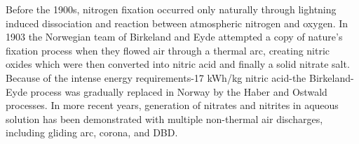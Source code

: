 Before the 1900s, nitrogen fixation occurred only naturally through lightning induced dissociation and reaction between atmospheric nitrogen and oxygen.  In 1903 the Norwegian team of Birkeland and Eyde attempted a copy of nature's fixation process when they flowed air through a thermal arc, creating nitric oxides which were then converted into nitric acid and finally a solid nitrate salt. \cite{kogelschatz2004atmospheric} Because of the intense energy requirements-17 kWh/kg nitric acid-the Birkeland-Eyde process was gradually replaced in Norway by the Haber and Ostwald processes.\cite{bakken1994high} In more recent years, generation of nitrates and nitrites in aqueous solution has been demonstrated with multiple non-thermal air discharges, including gliding arc, corona, and DBD.\cite{lelievre1995electrolysis,locke2006electrohydraulic,traylor2011long}

